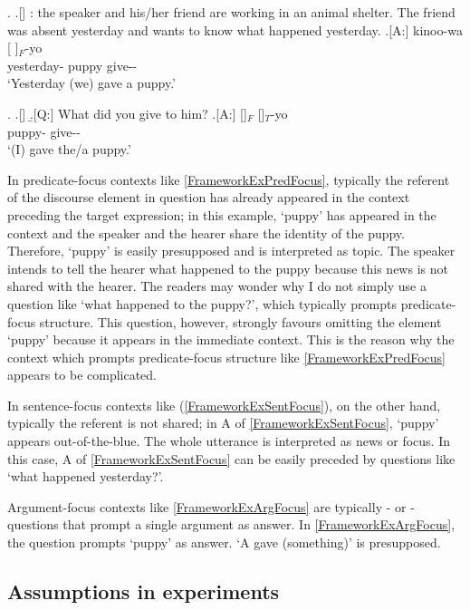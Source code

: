 		\ex. \label{FrameworkExSentFocus}
		\a.[] : the speaker and his/her friend are working in an animal shelter. The friend was absent yesterday and wants to know what happened yesterday.
		\bg.[A:] kinoo-wa [ ]$_{F}$-yo \\
		yesterday- puppy give-- \\
		`Yesterday (we) gave a puppy.'

\ex. \label{FrameworkExArgFocus}\a.[] 
	\b.[Q:] What did you give to him?
	\bg.[A:] []$_{F}$ []$_{T}$-yo \\
			 puppy- give-- \\
			`(I) gave the/a puppy.'

In predicate-focus contexts like \ref{FrameworkExPredFocus},
typically the referent of the discourse element in question has already appeared in the context preceding the target expression;
in this example,
 `puppy' has appeared in the context and the speaker and the hearer share the identity of the puppy.
Therefore,
 `puppy' is easily presupposed and is interpreted as topic.
The speaker intends to tell the hearer what happened to the puppy
because this news is not shared with the hearer.
The readers may wonder
why I do not simply use a question like `what happened to the puppy?',
which typically prompts predicate-focus structure.
This question, however,
strongly favours omitting the element  `puppy'
because it appears in the immediate context.
This is the reason why
the context which prompts predicate-focus structure like \ref{FrameworkExPredFocus} appears to be complicated.

In sentence-focus contexts like (\ref{FrameworkExSentFocus}),
on the other hand,
typically the referent is not shared;
in A of \ref{FrameworkExSentFocus},
 `puppy' appears out-of-the-blue.
The whole utterance is interpreted as news or focus.
In this case, A of \ref{FrameworkExSentFocus} can be easily preceded by
questions like `what happened yesterday?'.

Argument-focus contexts like \ref{FrameworkExArgFocus}
are typically - or -questions
that prompt a single argument as answer.
In \ref{FrameworkExArgFocus},
the question prompts  `puppy' as answer.
`A gave (something)' is presupposed.


\subsection{Assumptions in experiments}

